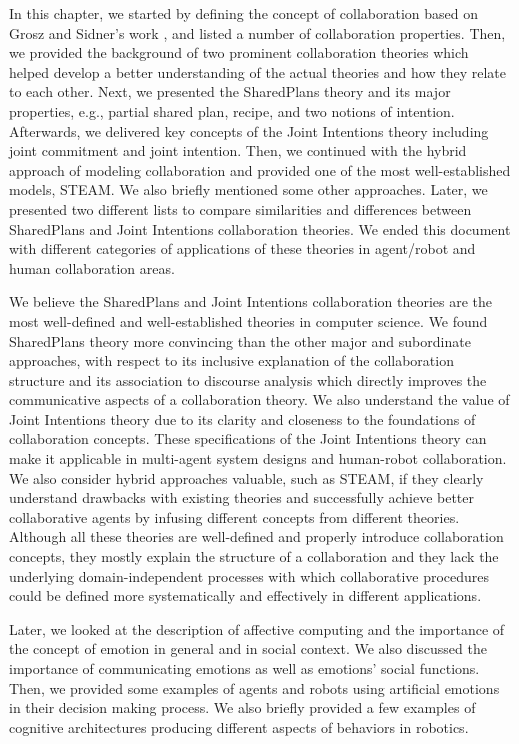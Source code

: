 \documentclass[12pt]{report}
\begin{document}
In this chapter, we started by defining the concept of collaboration based
on Grosz and Sidner's work \cite{grosz:plans-discourse}, and listed a number of
collaboration properties. Then, we provided the background of two prominent
collaboration theories which helped develop a better understanding of the actual
theories and how they relate to each other. Next, we presented the SharedPlans
theory and its major properties, e.g., partial shared plan, recipe, and two
notions of intention. Afterwards, we delivered key concepts of the Joint
Intentions theory including joint commitment and joint intention. Then, we
continued with the hybrid approach of modeling collaboration and provided one of
the most well-established models, STEAM. We also briefly mentioned some other
approaches. Later, we presented two different lists to compare similarities and
differences between SharedPlans and Joint Intentions collaboration theories. We
ended this document with different categories of applications of these theories
in agent/robot and human collaboration areas.

We believe the SharedPlans and Joint Intentions collaboration theories are the
most well-defined and well-established theories in computer science. We found
SharedPlans theory more convincing than the other major and subordinate
approaches, with respect to its inclusive explanation of the collaboration
structure and its association to discourse analysis which directly improves the
communicative aspects of a collaboration theory. We also understand the value of
Joint Intentions theory due to its clarity and closeness to the foundations of
collaboration concepts. These specifications of the Joint Intentions theory can
make it applicable in multi-agent system designs and human-robot collaboration.
We also consider hybrid approaches valuable, such as STEAM, if they clearly
understand drawbacks with existing theories and successfully achieve better
collaborative agents by infusing different concepts from different theories.
Although all these theories are well-defined and properly introduce
collaboration concepts, they mostly explain the structure of a collaboration and
they lack the underlying domain-independent processes with which collaborative
procedures could be defined more systematically and effectively in different
applications.

Later, we looked at the description of affective computing and the importance of
the concept of emotion in general and in social context. We also discussed the
importance of communicating emotions as well as emotions' social functions.
Then, we provided some examples of agents and robots using artificial emotions
in their decision making process. We also briefly provided a few examples of
cognitive architectures producing different aspects of behaviors in robotics.
\end{document}
